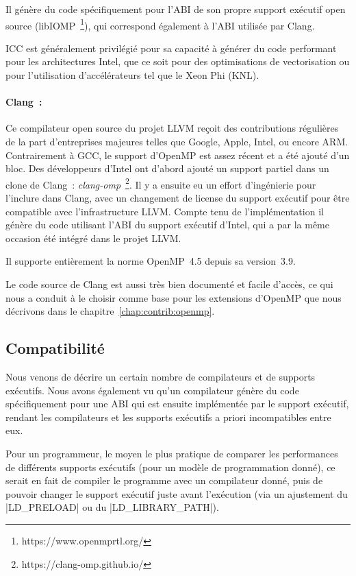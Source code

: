 Il génère du code spécifiquement pour l'ABI de son propre support exécutif open source (libIOMP~\footnote{https://www.openmprtl.org/}), qui correspond également à l'ABI utilisée par Clang.

ICC est généralement privilégié pour sa capacité à générer du code performant pour les architectures Intel, que ce soit pour des optimisations de vectorisation ou pour l'utilisation d'accélérateurs tel que le Xeon Phi (KNL).



\paragraph{Clang~:}
Ce compilateur open source du projet LLVM reçoit des contributions régulières de la part d'entreprises majeures telles que Google, Apple, Intel, ou encore ARM.
Contrairement à GCC, le support d'OpenMP est assez récent et a été ajouté d'un bloc.
Des développeurs d'Intel ont d'abord ajouté un support partiel dans un clone de Clang~: \emph{clang-omp}~\footnote{https://clang-omp.github.io/}.
Il y a ensuite eu un effort d'ingénierie pour l'inclure dans Clang, avec un changement de license du support exécutif pour être compatible avec l'infrastructure LLVM.
Compte tenu de l'implémentation il génère du code utilisant l'ABI du support exécutif d'Intel, qui a par la même occasion été intégré dans le projet LLVM.

Il supporte entièrement la norme OpenMP~4.5 depuis sa version~3.9.

Le code source de Clang est aussi très bien documenté et facile d'accès, ce qui nous a conduit à le choisir comme base pour les extensions d'OpenMP que nous décrivons dans le chapitre~\ref{chap:contrib:openmp}.

\subsection{Compatibilité}\label{sec:rw:compilers:compat}

Nous venons de décrire un certain nombre de compilateurs et de supports exécutifs.
Nous avons également vu qu'un compilateur génère du code spécifiquement pour une ABI qui est ensuite implémentée par le support exécutif, rendant les compilateurs et les supports exécutifs a priori incompatibles entre eux.

Pour un programmeur, le moyen le plus pratique de comparer les performances de différents supports exécutifs (pour un modèle de programmation donné), ce serait en fait de compiler le programme avec un compilateur donné, puis de pouvoir changer le support exécutif juste avant l'exécution (via un ajustement du |LD_PRELOAD| ou du |LD_LIBRARY_PATH|).

